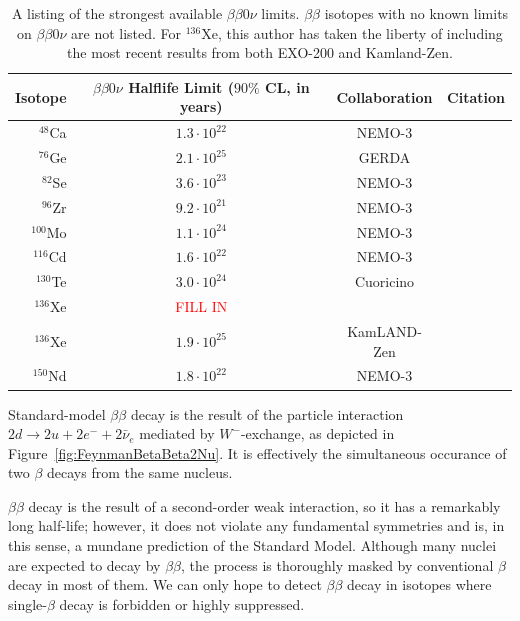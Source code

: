 \begin{table}
\begin{center}
\begin{tabular}{|rccc|}
\hline Isotope & \shortstack{$\beta\beta 0\nu$ Halflife Limit \\ ($90\%$ CL, in years)} & Collaboration & Citation \\ \hline
$^{48}$Ca & $1.3 \cdot 10^{22}$ & NEMO-3 & \cite{NEMO2011RandomOtherIsotopes}\\
$^{76}$Ge & $2.1 \cdot 10^{25}$ & GERDA & \cite{PhysRevLett.111.122503} \\
$^{82}$Se & $3.6 \cdot 10^{23}$ & NEMO-3 & \cite{NEMO2011RandomOtherIsotopes}\\
$^{96}$Zr & $9.2 \cdot 10^{21}$ & NEMO-3 & \cite{Argyriades2010168}\\
$^{100}$Mo & $1.1 \cdot 10^{24}$ & NEMO-3 & \cite{NEMO3-2013-100Mo}\\
$^{116}$Cd & $1.6 \cdot 10^{22}$ & NEMO-3 & \cite{NEMO2011RandomOtherIsotopes}\\
$^{130}$Te & $3.0 \cdot 10^{24}$ & Cuoricino & \cite{PhysRevC.78.035502}\\
$^{136}$Xe & \textcolor{red}{FILL IN} & & \\
$^{136}$Xe & $1.9 \cdot 10^{25}$ & KamLAND-Zen & \cite{PhysRevLett.110.062502}\\
$^{150}$Nd & $1.8 \cdot 10^{22}$ & NEMO-3 & \cite{PhysRevC.80.032501}\\
\hline
\end{tabular}
\end{center}
\caption{A listing of the strongest available $\beta\beta 0\nu$ limits.  $\beta\beta$ isotopes with no known limits on $\beta\beta 0\nu$ are not listed.  For $^{136}$Xe, this author has taken the liberty of including the most recent results from both EXO-200 and Kamland-Zen.}
\label{tab:0nubb_limits}
\end{table}

Standard-model $\beta\beta$ decay is the result of the particle interaction $2d \rightarrow 2u + 2e^- + 2\bar{\nu}_e$ mediated by $W^-$-exchange, as depicted in Figure~\ref{fig:FeynmanBetaBeta2Nu}.  It is effectively the simultaneous occurance of two $\beta$ decays from the same nucleus.

$\beta\beta$ decay is the result of a second-order weak interaction, so it has a remarkably long half-life; however, it does not violate any fundamental symmetries and is, in this sense, a mundane prediction of the Standard Model.  Although many nuclei are expected to decay by $\beta\beta$, the process is thoroughly masked by conventional $\beta$ decay in most of them.  We can only hope to detect $\beta\beta$ decay in isotopes where single-$\beta$ decay is forbidden or highly suppressed.

